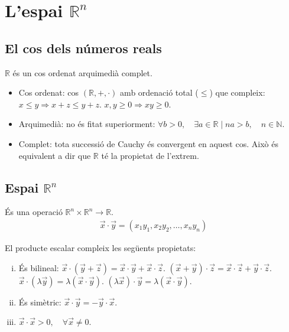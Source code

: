 \section{L'espai $\mathbb{R}^{n}$}
\subsection{El cos dels números reals}
$\mathbb{R}$ és un cos ordenat arquimedià complet.
\begin{itemize}
    \item Cos ordenat: cos $(\mathbb{R}, +, \cdot)$ amb ordenació total ($\leq$) que compleix:
        \subitem $x \leq y \Rightarrow x + z \leq y + z$.
        \subitem $x,y \geq 0 \Rightarrow xy \geq 0$.
    \item Arquimedià: no és fitat superiorment: $\forall b>0, \quad \exists a\in \mathbb{R} \mid na>b,  \quad  n  \in  \mathbb{N}$.
    \item Complet: tota successió de Cauchy és convergent en aquest cos. Això és equivalent a dir que $\mathbb{R}$ té la propietat de l'extrem.
\end{itemize}

\subsection{Espai $\mathbb{R}^{n}$}
\begin{defi}
    És una operació $\mathbb{R}^{n} \times \mathbb{R}^{n} \to \mathbb{R}$.
    \begin{align}
        \vec{x} \cdot \vec{y} = (x_{1} y_{1}, x_{2} y_{2}, \dots , x_{n} y_{n})
    \end{align}
\end{defi}
El producte escalar compleix les següents propietats:
\begin{enumerate}[i)]
     \item És bilineal: 
        \subitem $\vec{x} \cdot (\vec{y} + \vec{z}) = \vec{x} \cdot \vec{y} + \vec{x} \cdot \vec{z}$.
        \subitem $(\vec{x} + \vec{y}) \cdot \vec{z} = \vec{x} \cdot \vec{z} + \vec{y} \cdot \vec{z}$.
        \subitem $\vec{x} \cdot (\lambda \vec{y}) = \lambda (\vec{x} \cdot \vec{y})$.
        \subitem $(\lambda \vec{x}) \cdot \vec{y} = \lambda (\vec{x} \cdot \vec{y})$.
    \item És simètric: $\vec{x} \cdot \vec{y} = -\vec{y} \cdot \vec{x}$.
    \item $\vec{x} \cdot \vec{x} > 0, \quad \forall \vec{x} \neq 0$.
\end{enumerate}

